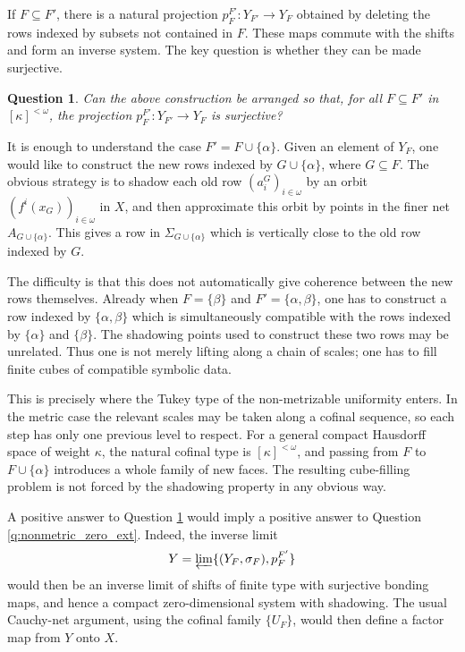 \documentclass[10pt,a4paper]{amsart}
\newtheorem{question}[theorem]{Question}
\numberwithin{equation}{section}
\begin{document}
If $F\subseteq F'$, there is a natural projection
$p_F^{F'}:Y_{F'}\to Y_F$ obtained by deleting the rows indexed by subsets not
contained in $F$. These maps commute with the shifts and form an inverse system.
The key question is whether they can be made surjective.

\begin{question}\label{q:surj_cubes}
Can the above construction be arranged so that, for all
$F\subseteq F'$ in $[\kappa]^{<\omega}$, the projection
$p_F^{F'}:Y_{F'}\to Y_F$ is surjective?
\end{question}

It is enough to understand the case $F'=F\cup\{\alpha\}$. Given an element of
$Y_F$, one would like to construct the new rows indexed by
$G\cup\{\alpha\}$, where $G\subseteq F$. The obvious strategy is to shadow each
old row $(a_i^G)_{i\in\omega}$ by an orbit $(f^i(x_G))_{i\in\omega}$ in $X$,
and then approximate this orbit by points in the finer net
$A_{G\cup\{\alpha\}}$. This gives a row in $\Sigma_{G\cup\{\alpha\}}$ which is
vertically close to the old row indexed by $G$.

The difficulty is that this does not automatically give coherence between the
new rows themselves. Already when $F=\{\beta\}$ and
$F'=\{\alpha,\beta\}$, one has to construct a row indexed by
$\{\alpha,\beta\}$ which is simultaneously compatible with the rows indexed by
$\{\alpha\}$ and $\{\beta\}$. The shadowing points used to construct these two
rows may be unrelated. Thus one is not merely lifting along a chain of scales;
one has to fill finite cubes of compatible symbolic data.

This is precisely where the Tukey type of the non-metrizable uniformity enters.
In the metric case the relevant scales may be taken along a cofinal sequence,
so each step has only one previous level to respect. For a general compact
Hausdorff space of weight $\kappa$, the natural cofinal type is
$[\kappa]^{<\omega}$, and passing from $F$ to $F\cup\{\alpha\}$ introduces a
whole family of new faces. The resulting cube-filling problem is not forced by
the shadowing property in any obvious way.

A positive answer to Question \ref{q:surj_cubes} would imply a positive answer
to Question \ref{q:nonmetric_zero_ext}. Indeed, the inverse limit
\[
    Y=\varprojlim\{(Y_F,\sigma_F),p_F^{F'}\}
\]
would then be an inverse limit of shifts of finite type with surjective bonding
maps, and hence a compact zero-dimensional system with shadowing. The usual
Cauchy-net argument, using the cofinal family $\{U_F\}$, would then define a
factor map from $Y$ onto $X$.
\end{document}
